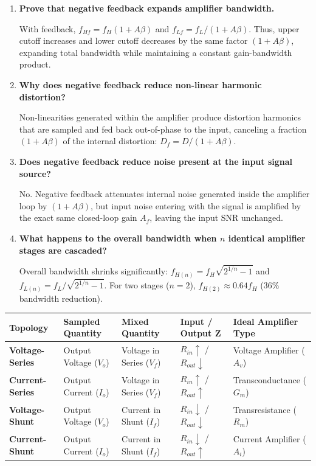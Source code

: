 \documentclass[12pt,a4paper]{article}
\newcommand{\Q}[1]{\textbf{#1}\par\noindent\ignorespaces}
\renewcommand{\arraystretch}{1.45}
\begin{document}
\begin{tcolorbox}[exambox, title={Frequently Asked / Viva Questions}]
\begin{enumerate}[topsep=0pt, label=\textbf{Q\arabic*.}, itemsep=5pt]
  \item \Q{Prove that negative feedback expands amplifier bandwidth.}
  With feedback, $f_{Hf} = f_H(1+A\beta)$ and $f_{Lf} = f_L/(1+A\beta)$. Thus, upper cutoff increases and lower cutoff decreases by the same factor $(1+A\beta)$, expanding total bandwidth while maintaining a constant gain-bandwidth product.

  \item \Q{Why does negative feedback reduce non-linear harmonic distortion?}
  Non-linearities generated within the amplifier produce distortion harmonics that are sampled and fed back out-of-phase to the input, canceling a fraction $(1+A\beta)$ of the internal distortion: $D_f = D/(1+A\beta)$.

  \item \Q{Does negative feedback reduce noise present at the input signal source?}
  No. Negative feedback attenuates internal noise generated inside the amplifier loop by $(1+A\beta)$, but input noise entering with the signal is amplified by the exact same closed-loop gain $A_f$, leaving the input SNR unchanged.

  \item \Q{What happens to the overall bandwidth when $n$ identical amplifier stages are cascaded?}
  Overall bandwidth shrinks significantly: $f_{H(n)} = f_H \sqrt{2^{1/n}-1}$ and $f_{L(n)} = f_L / \sqrt{2^{1/n}-1}$. For two stages ($n=2$), $f_{H(2)} \approx 0.64 f_H$ ($36\%$ bandwidth reduction).
\end{enumerate}
\end{tcolorbox}

\begin{tcolorbox}[tikzbox, title={Summary Comparison of the Four Feedback Topologies}]
\renewcommand{\arraystretch}{1.25}
\setlength{\tabcolsep}{5pt}
\noindent\begin{tabularx}{\linewidth}{|B{3.2cm}|B{2.6cm}|B{2.2cm}|B{2.2cm}|Y|}
\hline
\textbf{Topology} & \textbf{Sampled Quantity} & \textbf{Mixed Quantity} & \textbf{Input / Output Z} & \textbf{Ideal Amplifier Type} \\
\hline
\textbf{Voltage-Series} & Output Voltage ($V_o$) & Voltage in Series ($V_f$) & $R_{in}\uparrow$ / $R_{out}\downarrow$ & Voltage Amplifier ($A_v$) \\
\hline
\textbf{Current-Series} & Output Current ($I_o$) & Voltage in Series ($V_f$) & $R_{in}\uparrow$ / $R_{out}\uparrow$ & Transconductance ($G_m$) \\
\hline
\textbf{Voltage-Shunt}  & Output Voltage ($V_o$) & Current in Shunt ($I_f$) & $R_{in}\downarrow$ / $R_{out}\downarrow$ & Transresistance ($R_m$) \\
\hline
\textbf{Current-Shunt}  & Output Current ($I_o$) & Current in Shunt ($I_f$) & $R_{in}\downarrow$ / $R_{out}\uparrow$ & Current Amplifier ($A_i$) \\
\hline
\end{tabularx}\par
\end{tcolorbox}
\end{document}
